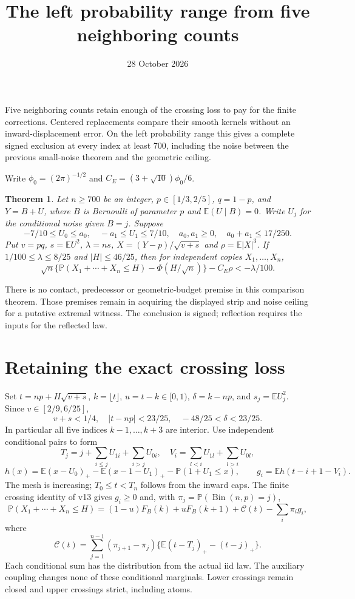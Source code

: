 \documentclass[11pt]{article}
\title{The left probability range from five neighboring counts}
\author{}\date{28 October 2026}
\newcommand{\E}{\mathbb E}\newcommand{\Pp}{\mathbb P}
\newtheorem{theorem}{Theorem}\newtheorem{lemma}[theorem]{Lemma}
\begin{document}
\maketitle

Five neighboring counts retain enough of the crossing loss to pay for the
finite corrections. Centered replacements compare their smooth kernels
without an inward-displacement error. On the left probability range this
gives a complete signed exclusion at every index at least 700, including
the noise between the previous small-noise theorem and the geometric ceiling.

Write $\phi_0=(2\pi)^{-1/2}$ and $C_E=(3+\sqrt{10})\phi_0/6$.
\begin{theorem}\label{thm:left}
Let $n\ge700$ be an integer, $p\in[1/3,2/5]$, $q=1-p$, and
$Y=B+U$, where $B$ is Bernoulli of parameter $p$ and $\E(U\mid B)=0$.
Write $U_j$ for the conditional noise given $B=j$. Suppose
\[
 -7/10\le U_0\le a_0,\quad -a_1\le U_1\le7/10,
 \quad a_0,a_1\ge0,\quad a_0+a_1\le17/250.
\]
Put $v=pq$, $s=\E U^2$, $\lambda=ns$, $X=(Y-p)/\sqrt{v+s}$ and
$\rho=\E|X|^3$. If $1/100\le\lambda\le8/25$ and $|H|\le46/25$, then
for independent copies $X_1,\ldots,X_n$,
\[
 \sqrt n\{\Pp(X_1+\cdots+X_n\le H)-\Phi(H/\sqrt n)\}
                       -C_E\rho<-\lambda/100.
\]
\end{theorem}

There is no contact, predecessor or geometric-budget premise in this
comparison theorem. Those premises remain in acquiring the displayed strip
and noise ceiling for a putative extremal witness. The conclusion is signed;
reflection requires the inputs for the reflected law.

\section{Retaining the exact crossing loss}
Set $t=np+H\sqrt{v+s}$, $k=\lfloor t\rfloor$, $u=t-k\in[0,1)$,
$\delta=k-np$, and $s_j=\E U_j^2$. Since $v\in[2/9,6/25]$,
\[
 v+s<1/4,\quad |t-np|<23/25,\quad
 -48/25<\delta<23/25.
\]
In particular all five indices $k-1,\ldots,k+3$ are interior.
Use independent conditional pairs to form
\[
 T_j=j+\sum_{i\le j}U_{1i}+\sum_{i>j}U_{0i},\quad
 V_i=\sum_{l<i}U_{1l}+\sum_{l>i}U_{0l},
\]
\[
 h(x)=\E(x-U_0)_+-\E(x-1-U_1)_+-\Pp(1+U_1\le x),
 \qquad g_i=\E h(t-i+1-V_i).
\]
The mesh is increasing; $T_0\le t<T_n$ follows from the inward caps.
The finite crossing identity of v13 gives $g_i\ge0$ and, with
$\pi_j=\Pp(\operatorname{Bin}(n,p)=j)$,
\begin{equation}\label{eq:cross}
 \Pp(X_1+\cdots+X_n\le H)
 =(1-u)F_B(k)+uF_B(k+1)+\mathcal C(t)-\sum_i\pi_i g_i,
\end{equation}
where
\[
 \mathcal C(t)=\sum_{j=1}^{n-1}(\pi_{j+1}-\pi_j)
       \{\E(t-T_j)_+-(t-j)_+\}.
\]
Each conditional sum has the distribution from the actual iid law.
The auxiliary coupling changes none of these conditional marginals.
Lower crossings remain closed and upper crossings strict, including atoms.
\end{document}
